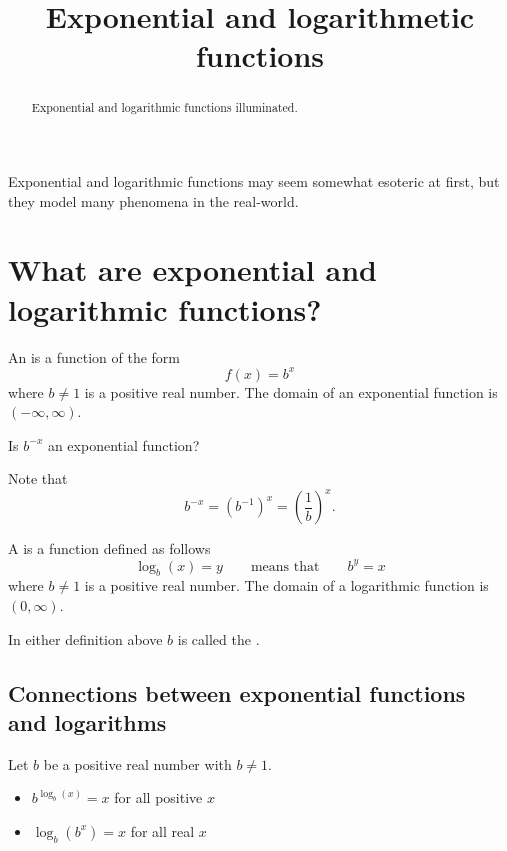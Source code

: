 \documentclass{ximera}
\title[Dig-In:]{Exponential and logarithmetic functions}
\begin{document}
\begin{abstract}
  Exponential and logarithmic functions illuminated.
\end{abstract}
\maketitle

Exponential and logarithmic functions may seem somewhat esoteric at
first, but they model many phenomena in the real-world.




\section{What are exponential and logarithmic functions?}


\begin{definition}
  An  is a function of the form
  \[
  f(x) = b^x
  \]
  where  $b\ne 1$ is a positive real number. The domain of an
  exponential function is $(-\infty,\infty)$.
\end{definition}

\begin{question}
  Is $b^{-x}$ an exponential function?
  \begin{multipleChoice}
  \end{multipleChoice}
  \begin{feedback}
    Note that
    \[
    b^{-x} = \left(b^{-1}\right)^x = \left(\frac{1}{b}\right)^x.
    \]
  \end{feedback}
\end{question}



\begin{definition}
  A  is a function defined as follows
  \[
  \log_b(x) = y \qquad\text{means that}\qquad b^y = x
  \]
  where  $b\ne 1$ is a positive real number. The domain of a
  logarithmic function is $(0,\infty)$.
\end{definition}

In either definition above $b$ is called the .

\subsection{Connections between exponential functions and logarithms}

Let $b$ be a positive real number with $b\ne 1$.
\begin{itemize}
\item $b^{\log_b(x)} = x$ for all positive $x$
\item $\log_b(b^x) = x$ for all real $x$
\end{itemize}
\end{document}
